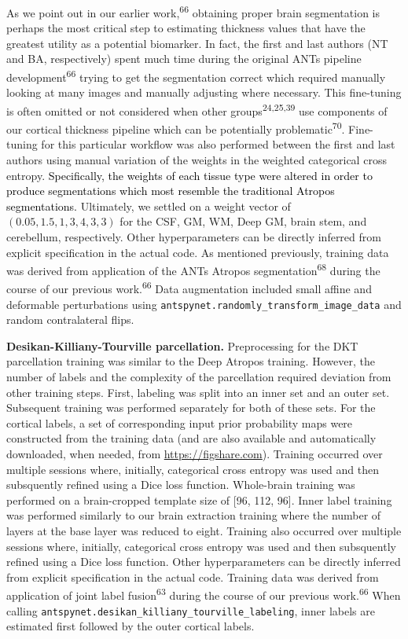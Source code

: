\documentclass[
  12pt,
]{article}
\begin{document}
As we point out in our earlier work,\textsuperscript{66} obtaining
proper brain segmentation is perhaps the most critical step to
estimating thickness values that have the greatest utility as a
potential biomarker. In fact, the first and last authors (NT and BA,
respectively) spent much time during the original ANTs pipeline
development\textsuperscript{66} trying to get the segmentation correct
which required manually looking at many images and manually adjusting
where necessary. This fine-tuning is often omitted or not considered
when other groups\textsuperscript{24,25,39} use components of our
cortical thickness pipeline which can be potentially
problematic\textsuperscript{70}. Fine-tuning for this particular
workflow was also performed between the first and last authors using
manual variation of the weights in the weighted categorical cross
entropy.
\textcolor{black}{Specifically, the weights of each tissue type were altered in
order to produce segmentations which most resemble the traditional Atropos segmentations.}
Ultimately, we settled on a weight vector of
\((0.05, 1.5, 1, 3, 4, 3, 3)\) for the CSF, GM, WM, Deep GM, brain stem,
and cerebellum, respectively. Other hyperparameters can be directly
inferred from explicit specification in the actual code. As mentioned
previously, training data was derived from application of the ANTs
Atropos segmentation\textsuperscript{68} during the course of our
previous work.\textsuperscript{66} Data augmentation included small
affine and deformable perturbations using
\texttt{antspynet.randomly\_transform\_image\_data} and random
contralateral flips.

\textbf{Desikan-Killiany-Tourville parcellation.} Preprocessing for the
DKT parcellation training was similar to the Deep Atropos training.
However, the number of labels and the complexity of the parcellation
required deviation from other training steps. First, labeling was split
into an inner set and an outer set. Subsequent training was performed
separately for both of these sets. For the cortical labels, a set of
corresponding input prior probability maps were constructed from the
training data (and are also available and automatically downloaded, when
needed, from \url{https://figshare.com}). Training occurred over
multiple sessions where, initially, categorical cross entropy was used
and then subsquently refined using a Dice loss function. Whole-brain
training was performed on a brain-cropped template size of {[}96, 112,
96{]}. Inner label training was performed similarly to our brain
extraction training where the number of layers at the base layer was
reduced to eight. Training also occurred over multiple sessions where,
initially, categorical cross entropy was used and then subsquently
refined using a Dice loss function. Other hyperparameters can be
directly inferred from explicit specification in the actual code.
Training data was derived from application of joint label
fusion\textsuperscript{63} during the course of our previous
work.\textsuperscript{66} When calling
\texttt{antspynet.desikan\_killiany\_tourville\_labeling}, inner labels
are estimated first followed by the outer cortical labels.
\end{document}
